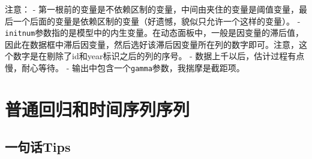\documentclass[
]{book}
\begin{document}
注意：
- 第一根\texttt{\textbar{}}前的变量是不依赖区制的变量，中间由\texttt{\textbar{}}夹住的变量是阈值变量，最后一个\texttt{\textbar{}}后面的变量是依赖区制的变量（好遗憾，貌似只允许一个这样的变量）。
- \texttt{initnum}参数指的是模型中的内生变量。在动态面板中，一般是因变量的滞后值，因此在数据框中滞后因变量，然后选好该滞后因变量所在列的数字即可。注意，这个数字是在剔除了id和year标识之后的列的序号。
- 数据上千以后，估计过程有点慢，耐心等待。
- 输出中包含一个\texttt{gamma}参数，我揣摩是截距项。

\hypertarget{TS}{%
\chapter{普通回归和时间序列序列}\label{TS}}

\hypertarget{ux4e00ux53e5ux8bddtips-1}{%
\section{一句话Tips}\label{ux4e00ux53e5ux8bddtips-1}}
\end{document}
